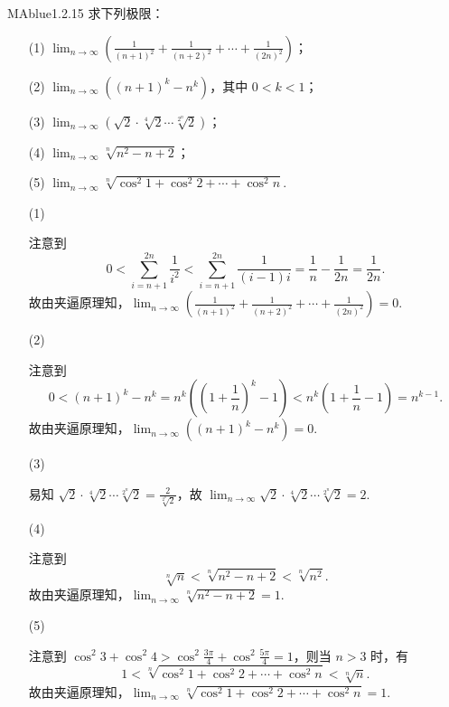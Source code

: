 \begin{problem}{MAblue}{1.2.15}
    求下列极限：
    \begin{enumerate}
        \item[(1)]
        $\displaystyle \lim_{n \to \infty} \left( \frac 1 {(n+1)^2} + \frac 1 {(n+2)^2} + \cdots + \frac 1 {(2n)^2} \right)$；
        \item[(2)]
        $\displaystyle \lim_{n \to \infty} \left( (n+1)^k - n^k \right)$，其中 $0 < k < 1$；
        \item[(3)]
        $\displaystyle \lim_{n \to \infty} \left( \sqrt 2 \cdot \sqrt[4] 2 \cdots \sqrt[2^n] 2 \right)$；
        \item[(4)]
        $\displaystyle \lim_{n \to \infty} \sqrt[n]{n^2 - n + 2}$；
        \item[(5)]
        $\displaystyle \lim_{n \to \infty} \sqrt[n]{\cos^2 1 + \cos^2 2 + \cdots + \cos^2 n}$.
    \end{enumerate}
\end{problem}

\begin{enumerate}
    \item[(1)]
    \begin{solution}
        注意到
        \[
            0 < \sum_{i=n+1}^{2n} \frac 1 {i^2} < \sum_{i=n+1}^{2n} \frac 1 {(i-1)i} = \frac 1 n - \frac 1 {2n} = \frac 1 {2n}.
        \]
        故由夹逼原理知，$\lim_{n \to \infty} \left( \frac 1 {(n+1)^2} + \frac 1 {(n+2)^2} + \cdots + \frac 1 {(2n)^2} \right) = 0$.
    \end{solution}
    \item[(2)]
    \begin{solution}
        注意到
        \[
            0 < (n+1)^k - n^k = n^k \left( \left( 1 + \frac 1 n \right)^k - 1 \right) < n^k \left( 1 + \frac 1 n - 1 \right) = n^{k-1}.
        \]
        故由夹逼原理知，$\lim_{n \to \infty} \left( (n+1)^k - n^k \right) = 0$.
    \end{solution}
    \item[(3)]
    \begin{solution}
        易知 $\sqrt 2 \cdot \sqrt[4] 2 \cdots \sqrt[2^n] 2 = \frac 2 {\sqrt[2^n] 2}$，故 $\lim_{n \to \infty} \sqrt 2 \cdot \sqrt[4] 2 \cdots \sqrt[2^n] 2 = 2$.
    \end{solution}
    \item[(4)]
    \begin{solution}
        注意到
        \[
            \sqrt[n] n < \sqrt[n]{n^2 - n + 2} < \sqrt[n]{n^2}.
        \]
        故由夹逼原理知，$\lim_{n \to \infty} \sqrt[n]{n^2 - n + 2} = 1$.
    \end{solution}
    \item[(5)]
    \begin{solution}
        注意到 $\cos^2 3 + \cos^2 4 > \cos^2 \frac {3\pi} 4 + \cos^2 \frac {5\pi} 4 = 1$，则当 $n > 3$ 时，有
        \[
            1 < \sqrt[n]{\cos^2 1 + \cos^2 2 + \cdots + \cos^2 n} < \sqrt[n] n.
        \]
        故由夹逼原理知，$\lim_{n \to \infty} \sqrt[n]{\cos^2 1 + \cos^2 2 + \cdots + \cos^2 n} = 1$.
    \end{solution}
\end{enumerate}

